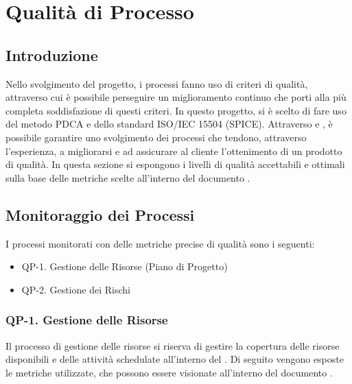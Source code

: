 \section{Qualità di Processo}

\subsection{Introduzione}

Nello svolgimento del progetto, i processi fanno uso di criteri di qualità, attraverso cui è possibile perseguire un miglioramento continuo che porti alla più completa soddisfazione di questi criteri. In questo progetto, si è scelto di fare uso del metodo PDCA e dello standard ISO/IEC 15504 (SPICE). Attraverso  e , è possibile garantire uno svolgimento dei processi che tendono, attraverso l'esperienza, a migliorarsi e ad assicurare al cliente l'ottenimento di un prodotto di qualità.
In questa sezione si espongono i livelli di qualità accettabili e ottimali sulla base delle metriche scelte all'interno del documento .

\subsection{Monitoraggio dei Processi}

I processi monitorati con delle metriche precise di qualità sono i seguenti:

\begin{itemize}
	\item QP-1. Gestione delle Risorse (Piano di Progetto)
	\item QP-2. Gestione dei Rischi
\end{itemize}

	\subsubsection{QP-1. Gestione delle Risorse}

		Il processo di gestione delle risorse si riserva di gestire la copertura delle risorse disponibili e delle attività schedulate all'interno del . Di seguito vengono esposte le metriche utilizzate, che possono essere visionate all'interno del documento .

